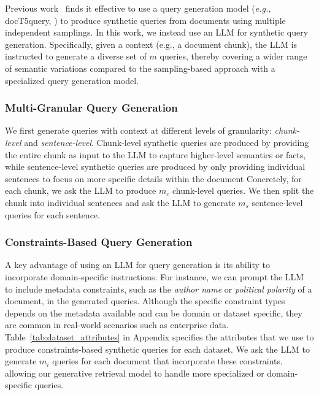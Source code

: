 Previous work~\citep{DBLP:journals/corr/abs-2206-10128} finds it effective to use a query generation model (\textit{e.g.,} docT5query, \citealp{nogueiradoc2query}) to produce synthetic queries from documents using multiple independent samplings. In this work, we instead use an LLM for synthetic query generation. Specifically, given a context (e.g., a document chunk), the LLM is instructed to generate a diverse set of $m$ queries, thereby covering a  wider range of semantic variations compared to the sampling-based approach with a specialized query generation model.


\subsubsection{Multi-Granular Query Generation} We first generate queries with context at different levels of granularity: \textit{chunk-level} and \textit{sentence-level}. Chunk-level synthetic queries are produced by providing the entire chunk as input to the LLM to capture higher-level semantics or facts, while sentence-level synthetic queries are produced by only providing individual sentences to focus on more specific details within the document
Concretely, for each chunk, we ask the LLM to produce $m_c$ chunk-level queries. We then split the chunk into individual sentences and ask the LLM to generate $m_s$ sentence-level queries for each sentence.

\subsubsection{Constraints-Based Query Generation}

A key advantage of using an LLM for query generation is its ability to incorporate domain-specific instructions.
For instance, we can prompt the LLM to include metadata constraints, such as the \textit{author name} or \textit{political polarity} of a document, in the generated queries.
Although the specific constraint types depends on the metadata available and can be domain or dataset specific, they are common in real-world scenarios such as enterprise data. Table~\ref{tab:dataset_attributes} in Appendix specifies the attributes that we use to produce constraints-based synthetic queries for each dataset. We ask the LLM to generate $m_i$ queries for each document that incorporate these constraints, allowing our generative retrieval model to handle more specialized or domain-specific queries.
